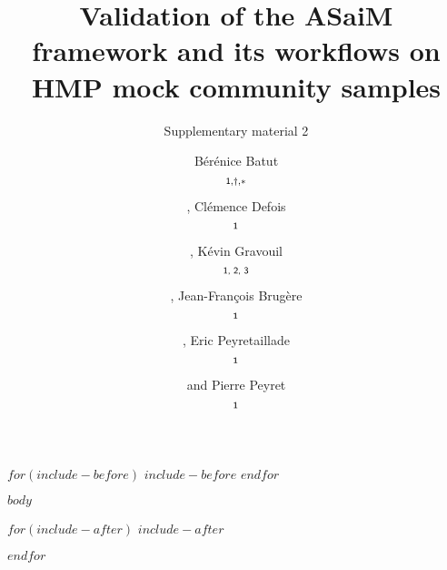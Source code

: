 \documentclass{bioinfo}
\begin{document}

\subtitle{Supplementary material 2}

\title{Validation of the ASaiM framework and its workflows on HMP mock community samples}
\author[]{Bérénice Batut$$^{\text{\sf 1}, \dagger, *}$$, Clémence Defois$$^{\text{\sf 1}}$$, Kévin Gravouil$$^{\text{\sf 1, \sf 2, \sf 3}}$$, Jean-François Brugère$$^{\text{\sf 1}}$$, Eric Peyretaillade$$^{\text{\sf 1}}$$ and Pierre Peyret$$^{\text{\sf 1}}$$}
\address{$$^{\text{\sf 1}}$$EA-4678 CIDAM, Clermont Université, Université d’Auvergne, Clermont-Ferrand, France$$^{\ddagger}$$\\
$$^{\text{\sf 2}}$$Université Clermont Auvergne, CNRS, LMGE, F-63000 Clermont–Ferrand, France\\
$$^{\text{\sf 3}}$$Université Clermont Auvergne, CNRS, LIMOS, F-63000 Clermont–Ferrand, France\\
$$^{\dagger}$$Present address: Bioinformatics Group, Department of Computer Science, University of Freiburg, 79110 Freiburg, Germany\\
$$^{\ddagger}$$Present address: Université Clermont Auvergne, INRA, MEDIS, F-63000 Clermont-Ferrand, France}



\maketitle

$for(include-before)$
$include-before$
$endfor$

$body$

%
%
%
%
%
%
%
%
%


%

$for(include-after)$
$include-after$

$endfor$

\let\cleardoublepage\clearpage
\end{document}
